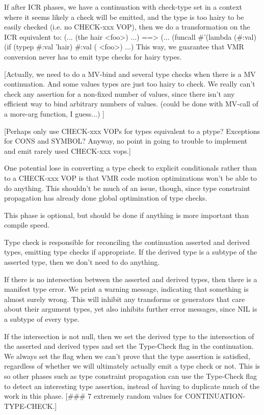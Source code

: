 If after ICR phases, we have a continuation with check-type set in a context
where it seems likely a check will be emitted, and the type is too 
hairy to be easily checked (i.e. no CHECK-xxx VOP), then we do a transformation
on the ICR equivalent to:
  (... (the hair <foo>) ...)
==>
  (... (funcall \#'(lambda (\#:val)
		    (if (typep \#:val 'hair)
			\#:val
			(%
		<foo>)
       ...)
This way, we guarantee that VMR conversion never has to emit type checks for
hairy types.

[Actually, we need to do a MV-bind and several type checks when there is a MV
continuation.  And some values types are just too hairy to check.  We really
can't check any assertion for a non-fixed number of values, since there isn't
any efficient way to bind arbitrary numbers of values.  (could be done with
MV-call of a more-arg function, I guess...)
]

[Perhaps only use CHECK-xxx VOPs for types equivalent to a ptype?  Exceptions
for CONS and SYMBOL?  Anyway, no point in going to trouble to implement and
emit rarely used CHECK-xxx vops.]

One potential lose in converting a type check to explicit conditionals rather
than to a CHECK-xxx VOP is that VMR code motion optimizations won't be able to
do anything.  This shouldn't be much of an issue, though, since type constraint
propagation has already done global optimization of type checks.


This phase is optional, but should be done if anything is more important than
compile speed.  

Type check is responsible for reconciling the continuation asserted and derived
types, emitting type checks if appropriate.  If the derived type is a subtype
of the asserted type, then we don't need to do anything.

If there is no intersection between the asserted and derived types, then there
is a manifest type error.  We print a warning message, indicating that
something is almost surely wrong.  This will inhibit any transforms or
generators that care about their argument types, yet also inhibits further
error messages, since NIL is a subtype of every type.

If the intersection is not null, then we set the derived type to the
intersection of the asserted and derived types and set the Type-Check flag in
the continuation.  We always set the flag when we can't prove that the type
assertion is satisfied, regardless of whether we will ultimately actually emit
a type check or not.  This is so other phases such as type constraint
propagation can use the Type-Check flag to detect an interesting type
assertion, instead of having to duplicate much of the work in this phase.  
[\#\#\# 7 extremely random values for CONTINUATION-TYPE-CHECK.]

